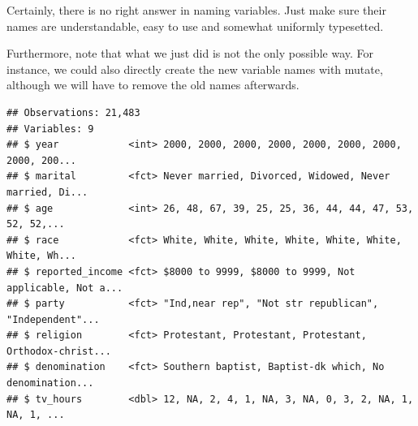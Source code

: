 \documentclass[]{tufte-book}
\newenvironment{Shaded}{}{}
\newcommand{\DataTypeTok}[1]{\textcolor[rgb]{0.56,0.13,0.00}{#1}}
\newcommand{\KeywordTok}[1]{\textcolor[rgb]{0.00,0.44,0.13}{\textbf{#1}}}
\newcommand{\NormalTok}[1]{#1}
\newcommand{\OperatorTok}[1]{\textcolor[rgb]{0.40,0.40,0.40}{#1}}
\newcommand{\StringTok}[1]{\textcolor[rgb]{0.25,0.44,0.63}{#1}}
\begin{document}
Certainly, there is no right answer in naming variables. Just make sure their names are understandable, easy to use and somewhat uniformly typesetted.

Furthermore, note that what we just did is not the only possible way. For instance, we could also directly create the new variable names with mutate, although we will have to remove the old names afterwards.

\begin{Shaded}
\end{Shaded}

\begin{verbatim}
## Observations: 21,483
## Variables: 9
## $ year            <int> 2000, 2000, 2000, 2000, 2000, 2000, 2000, 2000, 200...
## $ marital         <fct> Never married, Divorced, Widowed, Never married, Di...
## $ age             <int> 26, 48, 67, 39, 25, 25, 36, 44, 44, 47, 53, 52, 52,...
## $ race            <fct> White, White, White, White, White, White, White, Wh...
## $ reported_income <fct> $8000 to 9999, $8000 to 9999, Not applicable, Not a...
## $ party           <fct> "Ind,near rep", "Not str republican", "Independent"...
## $ religion        <fct> Protestant, Protestant, Protestant, Orthodox-christ...
## $ denomination    <fct> Southern baptist, Baptist-dk which, No denomination...
## $ tv_hours        <dbl> 12, NA, 2, 4, 1, NA, 3, NA, 0, 3, 2, NA, 1, NA, 1, ...
\end{verbatim}
\end{document}
